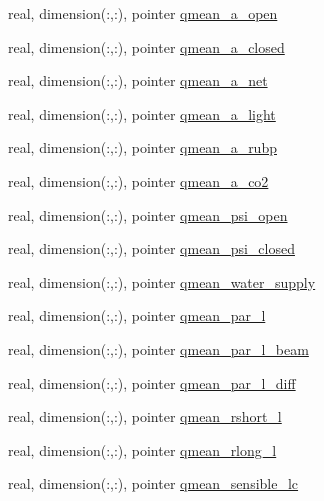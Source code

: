 \begin{DoxyCompactItemize}
real, dimension(\+:,\+:), pointer \hyperlink{structed__state__vars_1_1edtype_a53dc3df0e8fee5c79788a42e012b2d07}{qmean\+\_\+a\+\_\+open}
\item 
real, dimension(\+:,\+:), pointer \hyperlink{structed__state__vars_1_1edtype_a3f21af325ccd0f7d160f1a570b7e9df7}{qmean\+\_\+a\+\_\+closed}
\item 
real, dimension(\+:,\+:), pointer \hyperlink{structed__state__vars_1_1edtype_a25e402246d34cad54bcf4b39d757e57c}{qmean\+\_\+a\+\_\+net}
\item 
real, dimension(\+:,\+:), pointer \hyperlink{structed__state__vars_1_1edtype_a741c3a4f313eb3763c16e9b84daa5716}{qmean\+\_\+a\+\_\+light}
\item 
real, dimension(\+:,\+:), pointer \hyperlink{structed__state__vars_1_1edtype_a168729206c2fe3f1e8023fcef6b25a55}{qmean\+\_\+a\+\_\+rubp}
\item 
real, dimension(\+:,\+:), pointer \hyperlink{structed__state__vars_1_1edtype_a06e6cc8bd55be5ea57271ae3b661b743}{qmean\+\_\+a\+\_\+co2}
\item 
real, dimension(\+:,\+:), pointer \hyperlink{structed__state__vars_1_1edtype_a963ae1971274dd0df9d1f2c70216a044}{qmean\+\_\+psi\+\_\+open}
\item 
real, dimension(\+:,\+:), pointer \hyperlink{structed__state__vars_1_1edtype_a95576fb69479d63ecb556710561cf0eb}{qmean\+\_\+psi\+\_\+closed}
\item 
real, dimension(\+:,\+:), pointer \hyperlink{structed__state__vars_1_1edtype_a0fa2cdf8f496a0fa979483fa6ff09ec9}{qmean\+\_\+water\+\_\+supply}
\item 
real, dimension(\+:,\+:), pointer \hyperlink{structed__state__vars_1_1edtype_a50895b24c75f05ad36e4dbb8247bd907}{qmean\+\_\+par\+\_\+l}
\item 
real, dimension(\+:,\+:), pointer \hyperlink{structed__state__vars_1_1edtype_ae590cc1da319f6901c88007539852058}{qmean\+\_\+par\+\_\+l\+\_\+beam}
\item 
real, dimension(\+:,\+:), pointer \hyperlink{structed__state__vars_1_1edtype_a66feadfca4b4361fe636f274a69f37fc}{qmean\+\_\+par\+\_\+l\+\_\+diff}
\item 
real, dimension(\+:,\+:), pointer \hyperlink{structed__state__vars_1_1edtype_a0cd1924da5e7dee491ce6cddb73aefbf}{qmean\+\_\+rshort\+\_\+l}
\item 
real, dimension(\+:,\+:), pointer \hyperlink{structed__state__vars_1_1edtype_ace7c89b10fccbad90e0acadf795c842c}{qmean\+\_\+rlong\+\_\+l}
\item 
real, dimension(\+:,\+:), pointer \hyperlink{structed__state__vars_1_1edtype_a4b7bd097e5b3eb86aa4ad1b303ba07f8}{qmean\+\_\+sensible\+\_\+lc}

\end{DoxyCompactItemize}
